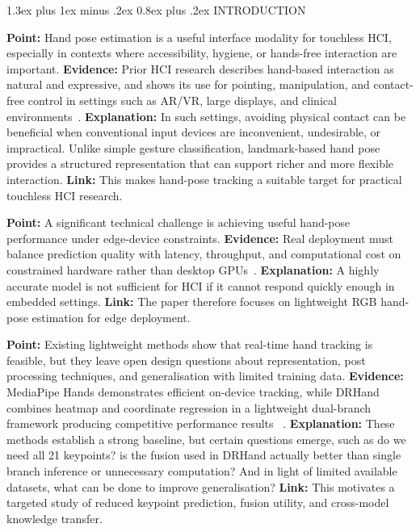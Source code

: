 \documentclass[10pt,letterpaper]{article}
\makeatletter
\renewcommand\section{\@startsection{section}{1}{\z@}%
  {1.3ex plus 1ex minus .2ex}%
  {0.8ex plus .2ex}%
  {\centering\normalfont\small\scshape}}
\makeatother
\begin{document}
\section{INTRODUCTION}

\medskip
\noindent\textbf{Point:} Hand pose estimation is a useful interface modality for touchless HCI, especially in contexts where accessibility, hygiene, or hands-free interaction are important.
\textbf{Evidence:} Prior HCI research describes hand-based interaction as natural and expressive, and shows its use for pointing, manipulation, and contact-free control in settings such as AR/VR, large displays, and clinical environments~\cite{vuletic,wachs,li_vr}.
\textbf{Explanation:} In such settings, avoiding physical contact can be beneficial when conventional input devices are inconvenient, undesirable, or impractical. Unlike simple gesture classification, landmark-based hand pose provides a structured representation that can support richer and more flexible interaction.
\textbf{Link:} This makes hand-pose tracking a suitable target for practical touchless HCI research.

\medskip
\noindent\textbf{Point:} A significant technical challenge is achieving useful hand-pose performance under edge-device constraints.
\textbf{Evidence:} Real deployment must balance prediction quality with latency, throughput, and computational cost on constrained hardware rather than desktop GPUs~\cite{attentionlite,srhandnet,dualreg}.
\textbf{Explanation:} A highly accurate model is not sufficient for HCI if it cannot respond quickly enough in embedded settings.
\textbf{Link:} The paper therefore focuses on lightweight RGB hand-pose estimation for edge deployment.

\medskip
\noindent\textbf{Point:} Existing lightweight methods show that real-time hand tracking is feasible, but they leave open design questions about representation, post processing techniques, and generalisation with limited training data.
\textbf{Evidence:} MediaPipe Hands demonstrates efficient on-device tracking, while DRHand combines heatmap and coordinate regression in a lightweight dual-branch framework producing competitive performance results ~\cite{mediapipe,dualreg}.
\textbf{Explanation:} These methods establish a strong baseline, but certain questions emerge, such as do we need all 21 keypoints? is the fusion used in DRHand actually better than single branch inference or unnecessary computation? And in light of limited available datasets, what can be done to improve generalisation? 
\textbf{Link:} This motivates a targeted study of reduced keypoint prediction, fusion utility, and cross-model knowledge transfer.
\end{document}
